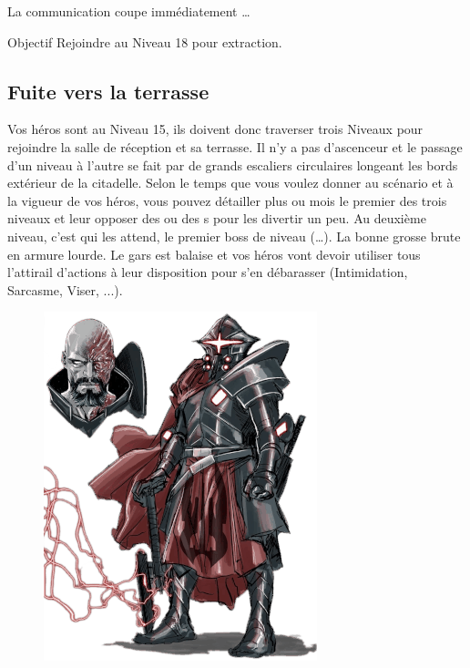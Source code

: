 La communication coupe immédiatement \dots

\begin{paperbox}{Objectif}
Rejoindre  au Niveau 18 pour extraction.
\end{paperbox}

\newpage

\subsection{Fuite vers la terrasse}

Vos héros sont au Niveau 15, ils doivent donc traverser trois Niveaux pour rejoindre la salle de réception et sa terrasse. Il n’y a pas d’ascenceur et le passage d’un niveau à l’autre se fait par de grands escaliers circulaires longeant les bords extérieur de la citadelle. Selon le temps que vous voulez donner au scénario et à la vigueur de vos héros, vous pouvez détailler plus ou mois le premier des trois niveaux et leur opposer des  ou des s pour les divertir un peu.
\bigbreak
Au deuxième niveau, c’est  qui les attend, le premier boss de niveau (\dots). La bonne grosse brute en armure lourde. Le gars est balaise et vos héros vont devoir utiliser tous l’attirail d’actions à leur disposition pour s’en débarasser (Intimidation, Sarcasme, Viser, ...).

\begin{figure}[h]
\noindent\includegraphics[width=\linewidth]{_img/pnjs/bombinax.png}
\caption{}
\end{figure}

